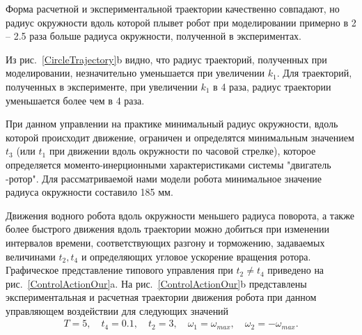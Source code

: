 
Форма расчетной и экспериментальной траектории качественно совпадают, но радиус окружности вдоль которой плывет робот при моделировании примерно в 2 -- 2.5 раза больше радиуса окружности, полученной в экспериментах.

Из рис.~\ref{CircleTrajectory}b видно, что радиус траекторий, полученных при моделировании, незначительно уменьшается при увеличении $k_1$. Для траекторий, полученных в эксперименте, при увеличении $k_1$ в 4 раза, радиус траектории уменьшается более чем в 4 раза.

При данном управлении на практике минимальный радиус окружности, вдоль которой происходит движение, ограничен и определятся минимальным значением $t_3$ (или $t_1$ при движении вдоль окружности по часовой стрелке), которое определяется моменто-инерционными характеристиками системы  "двигатель -ротор". Для рассматриваемой нами модели робота минимальное значение радиуса окружности составило 185 мм.

Движения водного робота вдоль окружности меньшего радиуса поворота, а также более быстрого движения вдоль траектории можно добиться при изменении интервалов времени, соответствующих разгону и торможению, задаваемых величинами $t_2, t_4$ и определяющих угловое ускорение вращения ротора. Графическое представление типового управления при $t_2 \neq t_4$ приведено на рис.~\ref{ControlActionOur}a. На рис.~\ref{ControlActionOur}b представлены экспериментальная и расчетная траектории движения робота при данном управляющем воздействии для следующих значений
\begin{gather}
T=5,\quad t_4 = 0.1,\quad t_2 = 3,\quad \omega_1 = \omega_{max},\quad \omega_2 = -\omega_{max}.
\end{gather}

